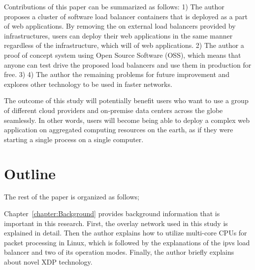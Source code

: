Contributions of this paper can be summarized as follows:
1) The author proposes a cluster of software load balancer containers that is deployed as a part of web applications.
By removing the  on external load balancers provided by infrastructures, users can deploy their web applications in the same manner regardless of the infrastructure, which will  of web applications.
2) The author  a proof of concept system using Open Source Software (OSS), which means that anyone can test drive the proposed load balancers and use them in production for free.
3) 
4) The author  the remaining problems for future improvement and explores other technology to be used in faster networks.

The outcome of this study will potentially benefit users who want to use a group of different cloud providers and on-premise data centers across the globe seamlessly.
In other words, users will become being able to deploy a complex web application on aggregated computing resources on the earth, as if they were starting a single process on a single computer.

\section{Outline}


The rest of the paper is organized as follows;

Chapter~\ref{chapter:Background} provides background information that is important in this research.
First, the overlay network used in this study is explained in detail.
Then the author explains how to utilize multi-core CPUs for packet processing in Linux,
which is followed by the explanations of the ipvs load balancer and two of its operation modes.
Finally, the author briefly explains about novel XDP technology.

